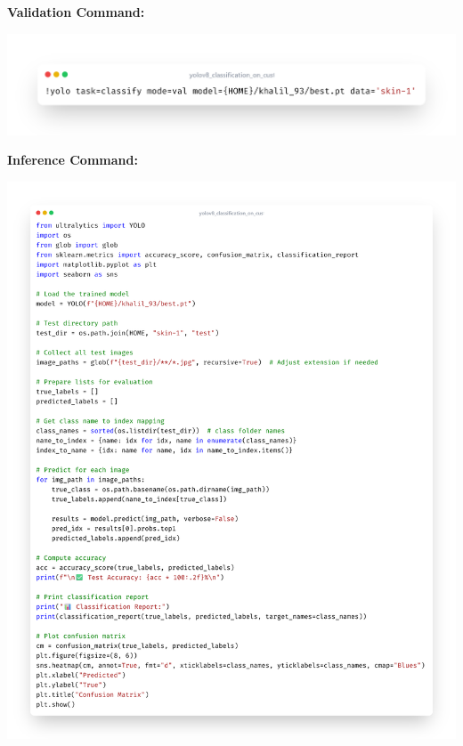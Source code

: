 \documentclass[a4paper,12pt]{report}
\begin{document}
\begin{spacing}{1.5}
    \textbf{Validation Command:}

    \begin{center}
        \includegraphics[width=\textwidth,keepaspectratio]{code/validation.png}
    \end{center}

    \textbf{Inference Command:}

    \begin{center}
        \includegraphics[width=\textwidth,keepaspectratio]{code/inference.png}
    \end{center}
    

\end{spacing}
\end{document}
